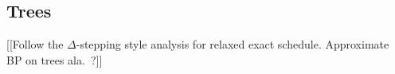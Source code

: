 \documentclass[11pt,a4paper]{article}
\newtheorem{theorem}{Theorem}
\theoremstyle{remark}
\newcommand{\N}{\mathcal{N}}
\newcommand{\norm}[1]{\lVert #1 \rVert}
\begin{document}









\subsection{Trees}

[[Follow the $\Delta$-stepping style analysis for relaxed exact schedule. Approximate BP on trees ala.~\cite{pmlr-v5-gonzalez09a}?]]

\renewcommand{\doi}[1]{\href{http://dx.doi.org/#1}{\footnotesize\sf doi:\Doi{#1}}}



\end{document}
